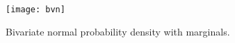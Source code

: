\documentclass[12pt]{article}
\begin{document}
\begin{figure}
    \centering
    \texttt{[image: bvn]}













    \caption{Bivariate normal probability density with marginals.}%
    \label{fig:gibbssampler:bivarnorm}
\end{figure}
\end{document}
